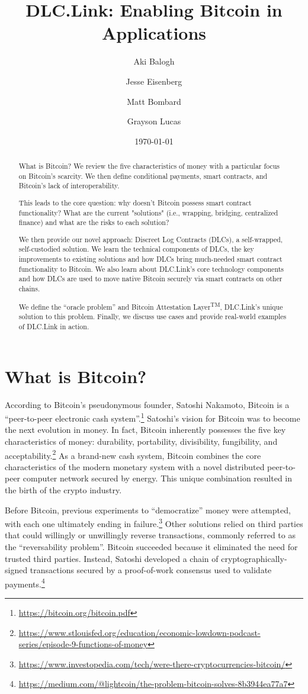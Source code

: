 \documentclass[twoside, a4paper, 11pt]{article}
\title{DLC.Link: Enabling Bitcoin in Applications}
\author{Aki Balogh \and Jesse Eisenberg \and Matt Bombard \and Grayson Lucas}
\date{\today}
\begin{document}
\maketitle
  \begin{abstract}
    What is Bitcoin? We review the five characteristics of money with a particular focus on Bitcoin’s scarcity. We then define conditional payments, smart contracts, and Bitcoin's lack of interoperability.

    This leads to the core question: why doesn’t Bitcoin possess smart contract functionality? What are the current "solutions" (i.e., wrapping, bridging, centralized finance) and what are the risks to each solution?

    We then provide our novel approach: Discreet Log Contracts (DLCs), a self-wrapped, self-custodied solution. We learn the technical components of DLCs, the key improvements to existing solutions and how DLCs bring much-needed smart contract functionality to Bitcoin. We also learn about DLC.Link’s core technology components and how DLCs are used to move native Bitcoin securely via smart contracts on other chains.

    We define the “oracle problem” and Bitcoin Attestation Layer\textsuperscript{TM}, DLC.Link’s unique solution to this problem. Finally, we discuss use cases and provide real-world examples of DLC.Link in action.
  \end{abstract}

  \section{What is Bitcoin?}
  According to Bitcoin’s pseudonymous founder, Satoshi Nakamoto, Bitcoin is a “peer-to-peer electronic cash system”.\footnote{\url{https://bitcoin.org/bitcoin.pdf}} Satoshi’s vision for Bitcoin was to become the next evolution in money. In fact, Bitcoin inherently possesses the five key characteristics of money: durability, portability, divisibility, fungibility, and acceptability.\footnote{\url{https://www.stlouisfed.org/education/economic-lowdown-podcast-series/episode-9-functions-of-money}} As a brand-new cash system, Bitcoin combines the core characteristics of the modern monetary system with a novel distributed peer-to-peer computer network secured by energy. This unique combination resulted in the birth of the crypto industry.

  Before Bitcoin, previous experiments to “democratize” money were attempted, with each one ultimately ending in failure.\footnote{\url{https://www.investopedia.com/tech/were-there-cryptocurrencies-bitcoin/}} Other solutions relied on third parties that could willingly or unwillingly reverse transactions, commonly referred to as the “reversability problem”. Bitcoin succeeded because it eliminated the need for trusted third parties. Instead, Satoshi developed a chain of cryptographically-signed transactions secured by a proof-of-work consensus used to validate payments.\footnote{\url{https://medium.com/@lightcoin/the-problem-bitcoin-solves-8b3944ea77a7}}
\end{document}

